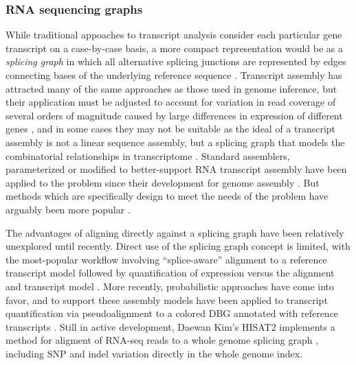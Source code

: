 
\subsubsection{RNA sequencing graphs}

While traditional appoaches to transcript analysis consider each particular gene transcript on a case-by-case basis, a more compact representation would be as a \emph{splicing graph} in which all alternative splicing junctions are represented by edges connecting bases of the underlying reference sequence \cite{heber2002splicing,lee2002POA}.
Transcript assembly has attracted many of the same approaches as those used in genome inference, but their application must be adjusted to account for variation in read coverage of several orders of magnitude caused by large differences in expression of different genes \cite{martin2011next}, and in some cases they may not be suitable as the ideal of a transcript assembly is not a linear sequence assembly, but a splicing graph that models the combinatorial relationships in transcriptome \cite{grabherr2011trinity}.
Standard assemblers, parameterized or modified to better-support RNA transcript assembly have been applied to the problem since their development for genome assembly \cite{birol2009novo,robertson2010novo,grabherr2011full,schulz2012oases}.
But methods which are specifically design to meet the needs of the problem have arguably been more popular \cite{grabherr2011trinity,chang2015bridger}.

The advantages of aligning directly against a splicing graph have been relatively unexplored until recently.
Direct use of the splicing graph concept is limited, with the most-popular workflow involving ``splice-aware'' alignment to a reference transcript model followed by quantification of expression versus the alignment and transcript model \cite{trapnell2012differential}.
More recently, probabilistic approaches have come into favor, and to support these assembly models have been applied to transcript quantification via pseudoalignment to a colored DBG annotated with reference transcripts \cite{bray2016near}.
Still in active development, Daewan Kim's HISAT2 implements a method for aligment of RNA-seq reads to a whole genome splicing graph \cite{kim2015hisat,kim2017hisat2}, including SNP and indel variation directly in the whole genome index.

